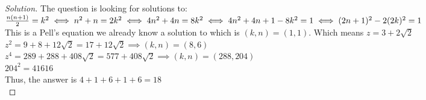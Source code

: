 \begin{proof}
    [Solution]
    The question is looking for solutions to:\\
    $\frac{n(n+1)}{2}=k^2\\
    \iff n^2+n=2k^2\\
    \iff 4n^2+4n=8k^2\\
    \iff 4n^2+4n+1-8k^2=1\\
    \iff (2n+1)^2-2(2k)^2=1$\\
    This is a Pell's equation we already know a solution to which is $(k,n)=(1,1)$. Which means $z=3+2\sqrt{2}$\\
    $z^2=9+8+12\sqrt{2}=17+12\sqrt{2} \implies (k,n)=(8,6)$\\
    $z^4=289+288+408\sqrt{2}=577+408\sqrt{2} \implies (k,n)=(288, 204)$\\
    $204^2=41616$\\
    Thus, the answer is $4+1+6+1+6=18$\\
\end{proof}
